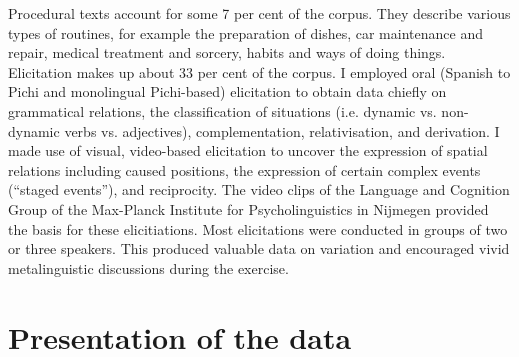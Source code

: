 Procedural texts account for some 7 per cent of the corpus. They describe various types of routines, for example the preparation of dishes, car maintenance and repair, medical treatment and sorcery, habits and ways of doing things. Elicitation makes up about 33 per cent of the corpus. I employed oral (Spanish to Pichi and monolingual Pichi-based) elicitation to obtain data chiefly on grammatical relations, the classification of situations (i.e. dynamic vs. non-dynamic verbs vs. adjectives), complementation, relativisation, and derivation. I made use of visual, video-based elicitation to uncover the expression of spatial relations including caused positions, the expression of certain complex events (“staged events”), and reciprocity. The video clips of the Language and Cognition Group of the Max-Planck Institute for Psycholinguistics in Nijmegen provided the basis for these elicitiations. Most elicitations were conducted in groups of two or three speakers. This produced valuable data on variation and encouraged vivid metalinguistic discussions during the exercise. 


\section{Presentation of the data}\label{sec:1.8}
% 

